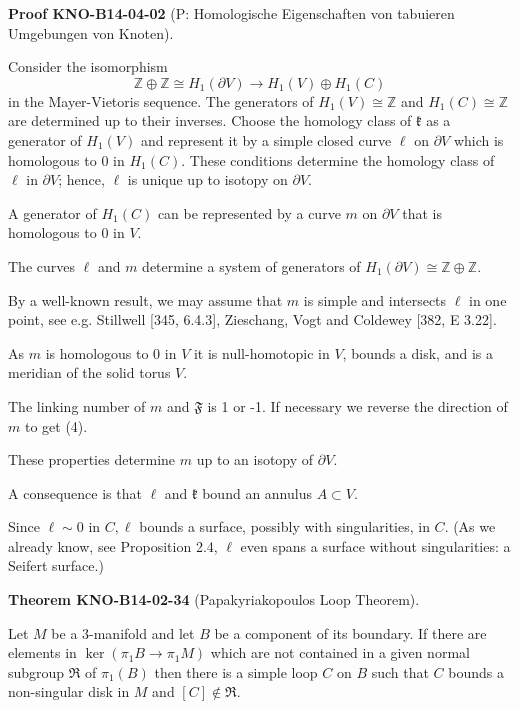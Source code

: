 \documentclass[10pt, letterpaper]{article}
\newcommand{\CustomHeading}[3]{%
  \par\medskip\noindent%
  \textbf{#1 #2} \textnormal{(#3)}.\enskip%
}
\newenvironment{THEO}[2]{\CustomHeading{Theorem}{#1}{#2}}{}
\newenvironment{PROOF}[2]{\CustomHeading{Proof}{#1}{#2}}{}
\begin{document}
\begin{PROOF}{KNO-B14-04-02}{P: Homologische Eigenschaften von tabuieren Umgebungen von Knoten}
Consider the isomorphism
$$
\mathbb{Z} \oplus \mathbb{Z} \cong H_{1}(\partial V) \rightarrow H_{1}(V) \oplus H_{1}(C)
$$
in the Mayer-Vietoris sequence. The generators of $H_{1}(V) \cong \mathbb{Z}$ and $H_{1}(C) \cong \mathbb{Z}$ are determined up to their inverses. Choose the homology class of $\mathfrak{k}$ as a generator of $H_{1}(V)$ and represent it by a simple closed curve $\ell$ on $\partial V$ which is homologous to 0 in $H_{1}(C)$. These conditions determine the homology class of $\ell$ in $\partial V$; hence, $\ell$ is unique up to isotopy on $\partial V$. 

A generator of $H_{1}(C)$ can be represented by a curve $m$ on $\partial V$ that is homologous to 0 in $V$. 

The curves $\ell$ and $m$ determine a system of generators of $H_{1}(\partial V) \cong \mathbb{Z} \oplus \mathbb{Z}$. 

By a well-known result, we may assume that $m$ is simple and intersects $\ell$ in one point, see e.g. Stillwell [345, 6.4.3], Zieschang, Vogt and Coldewey [382, E 3.22]. 

As $m$ is homologous to 0 in $V$ it is null-homotopic in $V$, bounds a disk, and is a meridian of the solid torus $V$. 

The linking number of $m$ and $\mathfrak{F}$ is 1 or -1. If necessary we reverse the direction of $m$ to get (4). 

These properties determine $m$ up to an isotopy of $\partial V$. 

A consequence is that $\ell$ and $\mathfrak{k}$ bound an annulus $A \subset V$.

Since $\ell \sim 0$ in $C, \ell$ bounds a surface, possibly with singularities, in $C$. (As we already know, see Proposition 2.4, $\ell$ even spans a surface without singularities: a Seifert surface.)
\end{PROOF}

\begin{THEO}{KNO-B14-02-34}{Papakyriakopoulos Loop Theorem}
Let $M$ be a 3-manifold and let $B$ be a component of its boundary. If there are elements in $\operatorname{ker}\left(\pi_1 B \rightarrow \pi_1 M\right)$ which are not contained in a given normal subgroup $\Re$ of $\pi_1(B)$ then there is a simple loop $C$ on $B$ such that $C$ bounds a non-singular disk in $M$ and $[C] \notin \Re$.
\end{THEO}
\end{document}
